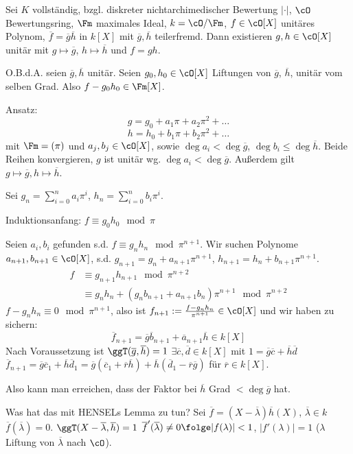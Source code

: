 \renewcommand{\lecdate}{04.02.2015}

\begin{Bemerkung}
 Sei $K$ vollständig, bzgl. diskreter nichtarchimedischer Bewertung $|\cdot|$, $\cO$ Bewertungsring, $\Fm$ maximales Ideal, $k=\cO/\Fm$, $f\in\cO[X]$ unitäres Polynom, $\overline{f}=\overline{g}\overline{h}$ in $k[X]$ mit $\overline{g}, \overline{h}$ teilerfremd. Dann existieren $g,h\in\cO[X]$ unitär mit $g\mapsto \overline{g}$, $h\mapsto\overline h$ und $f=gh$.
 
 \begin{Beweis}
  O.B.d.A. seien $\overline{g}, \overline{h}$ unitär. Seien $g_0,h_0\in\cO[X]$ Liftungen von $\overline{g}$, $\overline{h}$, unitär vom selben Grad. Also $f-g_0h_0\in\Fm[X]$.
  
  Ansatz: \[g=g_0+a_1\pi+a_2\pi^2+\ldots\] \[h=h_0+b_1\pi+b_2\pi^2+\ldots \]
  mit $\Fm=(\pi)$ und $a_j,b_j\in\cO[X]$, sowie $\deg a_i<\deg \overline{g}$, $\deg b_i\leq \deg \overline{h}$.
  Beide Reihen konvergieren, $g$ ist unitär wg. $\deg a_i<\deg \overline{g}$. Außerdem gilt $g\mapsto \overline g, h\mapsto \overline h$.
  
  Sei $g_n=\sum_{i=0}^n a_i\pi^i$, $h_n=\sum_{i=0}^nb_i\pi^i$.
  
  Induktionsanfang: $f\equiv g_0h_0 \mod{\pi}$
  
  Seien $a_i,b_i$ gefunden s.d. $f\equiv g_nh_n\mod {\pi^{n+1}}$.
  Wir suchen Polynome $a_{n+1}, b_{n+1}\in\cO[X]$, s.d. $g_{n+1}=g_n+a_{n+1}\pi^{n+1}$, $h_{n+1}=h_n+b_{n+1}\pi^{n+1}$.
  \begin{align*}
   f&\equiv g_{n+1}h_{n+1} \mod{\pi^{n+2}}\\
   &\equiv g_nh_n+(g_nb_{n+1}+a_{n+1}b_n)\pi^{n+1}\mod{\pi^{n+2}}
  \end{align*}
  $f-g_nh_n\equiv 0\mod{\pi^{n+1}}$, also ist $f_{n+1}:= \frac{f-g_nh_n}{\pi^{n+1}}\in\cO[X]$ und wir haben zu sichern:
  \[\overline{f}_{n+1}=\overline{g}\overline b_{n+1} + \overline{a}_{n+1}\overline{h}\in k[X] \]
  Nach Voraussetzung ist $\ggT(\overline g, \overline h)=1$ \folge $\exists \overline c, \overline d \in k[X]$ mit $1=\overline g\overline c + \overline h \overline d$
  \folge $\overline f_{n+1}=\overline g\overline c_1+\overline h \overline{d}_1=\overline g(\overline c_1+\overline r\overline h)+\overline h(\overline d_1-\overline r\overline g)$ für $\overline r\in k[X]$.
  
  Also kann man erreichen, dass der Faktor bei $\overline h$ Grad $<\deg \overline g$ hat.
 \end{Beweis}
 
 Was hat das mit HENSELs Lemma zu tun? Sei $\overline f=(X-\overline \lambda)\overline h(X)$, $\overline \lambda\in k$ \folge $\overline f(\overline \lambda)=0$. $\ggT(X-\overline \lambda,\overline h)=1$ \folge $\overline f'(\overline \lambda)\neq 0 \folge |f(\lambda)|<1$, $|f'(\lambda)|=1$ ($\lambda$ Liftung von $\overline \lambda$ nach $\cO$).
\end{Bemerkung}

